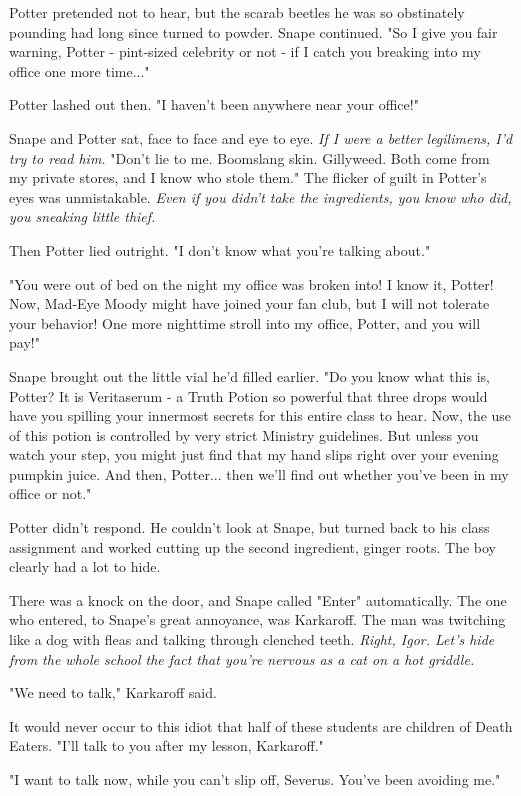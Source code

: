 Potter pretended not to hear, but the scarab beetles he was so obstinately pounding had long since turned to powder. Snape continued. "So I give you fair warning, Potter - pint-sized celebrity or not - if I catch you breaking into my office one more time..."

Potter lashed out then. "I haven't been anywhere near your office!"

Snape and Potter sat, face to face and eye to eye. \emph{If I were a better legilimens, I'd try to read him.} "Don't lie to me. Boomslang skin. Gillyweed. Both come from my private stores, and I know who stole them." The flicker of guilt in Potter's eyes was unmistakable. \emph{Even if you didn't take the ingredients, you know who did, you sneaking little thief.}

Then Potter lied outright. "I don't know what you're talking about."

"You were out of bed on the night my office was broken into! I know it, Potter! Now, Mad-Eye Moody might have joined your fan club, but I will not tolerate your behavior! One more nighttime stroll into my office, Potter, and you will pay!"

Snape brought out the little vial he'd filled earlier. "Do you know what this is, Potter? It is Veritaserum - a Truth Potion so powerful that three drops would have you spilling your innermost secrets for this entire class to hear. Now, the use of this potion is controlled by very strict Ministry guidelines. But unless you watch your step, you might just find that my hand slips right over your evening pumpkin juice. And then, Potter... then we'll find out whether you've been in my office or not."

Potter didn't respond. He couldn't look at Snape, but turned back to his class assignment and worked cutting up the second ingredient, ginger roots. The boy clearly had a lot to hide.

There was a knock on the door, and Snape called "Enter" automatically. The one who entered, to Snape's great annoyance, was Karkaroff. The man was twitching like a dog with fleas and talking through clenched teeth. \emph{Right, Igor. Let's hide from the whole school the fact that you're nervous as a cat on a hot griddle.}

"We need to talk," Karkaroff said.

It would never occur to this idiot that half of these students are children of Death Eaters. "I'll talk to you after my lesson, Karkaroff."

"I want to talk now, while you can't slip off, Severus. You've been avoiding me."

